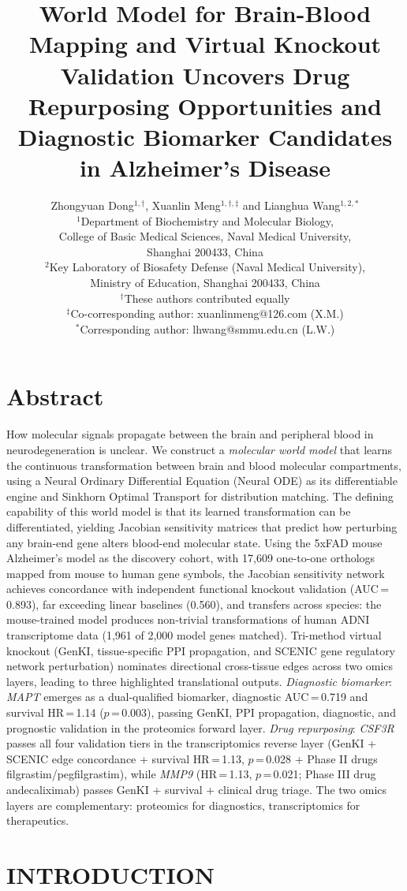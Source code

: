 \documentclass[12pt,a4paper]{article}
\title{\textbf{World Model for Brain-Blood Mapping and Virtual Knockout Validation Uncovers Drug Repurposing Opportunities and Diagnostic Biomarker Candidates in Alzheimer's Disease}}
\author{Zhongyuan Dong$^{1,\dagger}$, Xuanlin Meng$^{1,\dagger,\ddagger}$ and Lianghua Wang$^{1,2,*}$\\[1em]
\small $^{1}$Department of Biochemistry and Molecular Biology,\\
\small College of Basic Medical Sciences, Naval Medical University,\\
\small Shanghai 200433, China\\[0.5em]
\small $^{2}$Key Laboratory of Biosafety Defense (Naval Medical University),\\
\small Ministry of Education, Shanghai 200433, China\\[0.5em]
\small $^{\dagger}$These authors contributed equally\\[0.3em]
\small $^{\ddagger}$Co-corresponding author: xuanlinmeng@126.com (X.M.)\\[0.3em]
\small $^{*}$Corresponding author: lhwang@smmu.edu.cn (L.W.)}
\date{}
\begin{document}
\maketitle

\section*{Abstract}
How molecular signals propagate between the brain and peripheral blood in neurodegeneration is unclear. We construct a \emph{molecular world model} that learns the continuous transformation between brain and blood molecular compartments, using a Neural Ordinary Differential Equation (Neural ODE) as its differentiable engine and Sinkhorn Optimal Transport for distribution matching. The defining capability of this world model is that its learned transformation can be differentiated, yielding Jacobian sensitivity matrices that predict how perturbing any brain-end gene alters blood-end molecular state. Using the 5xFAD mouse Alzheimer's model as the discovery cohort, with 17{,}609 one-to-one orthologs mapped from mouse to human gene symbols, the Jacobian sensitivity network achieves concordance with independent functional knockout validation (AUC\,=\,0.893), far exceeding linear baselines (0.560), and transfers across species: the mouse-trained model produces non-trivial transformations of human ADNI transcriptome data (1,961 of 2,000 model genes matched). Tri-method virtual knockout (GenKI, tissue-specific PPI propagation, and SCENIC gene regulatory network perturbation) nominates directional cross-tissue edges across two omics layers, leading to three highlighted translational outputs. \emph{Diagnostic biomarker}: \textit{MAPT} emerges as a dual-qualified biomarker, diagnostic AUC\,=\,0.719 and survival HR\,=\,1.14 ($p$\,=\,0.003), passing GenKI, PPI propagation, diagnostic, and prognostic validation in the proteomics forward layer. \emph{Drug repurposing}: \textit{CSF3R} passes all four validation tiers in the transcriptomics reverse layer (GenKI + SCENIC edge concordance + survival HR\,=\,1.13, $p$\,=\,0.028 + Phase II drugs filgrastim/pegfilgrastim), while \textit{MMP9} (HR\,=\,1.13, $p$\,=\,0.021; Phase III drug andecaliximab) passes GenKI + survival + clinical drug triage. The two omics layers are complementary: proteomics for diagnostics, transcriptomics for therapeutics.

\section{INTRODUCTION}
\end{document}
